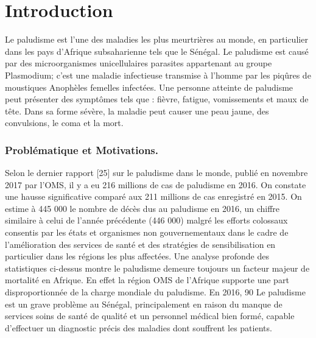
\section{Introduction}\label{Introduction}
Le paludisme est l’une des maladies les plus meurtrières au monde, en particulier dans les pays d’Afrique subsaharienne tels que le Sénégal. Le paludisme est causé par des microorganismes unicellulaires parasites appartenant au groupe Plasmodium; c'est une maladie infectieuse transmise à l'homme par les piqûres de moustiques Anophèles femelles infectées. Une personne atteinte de paludisme peut présenter des symptômes tels que : fièvre, fatigue, vomissements et maux de tête. Dans sa forme sévère, la maladie peut causer une peau jaune, des convulsions, le coma et  la mort.
\subsubsection{Problématique et Motivations.}
Selon le dernier rapport [25] sur le paludisme dans le monde, publié en novembre 2017 par l’OMS, il y a eu 216 millions de cas de paludisme en 2016. On constate une hausse significative comparé aux 211 millions de cas enregistré en 2015.
 On estime à 445 000 le nombre de décès dus au paludisme en 2016, un chiffre similaire à celui de l’année précédente (446 000) malgré les efforts colossaux  consentis par les états et organismes non gouvernementaux dans le cadre de l’amélioration des services de santé et des stratégies de sensibilisation en  particulier dans les régions les plus affectées.
Une analyse profonde des statistiques ci-dessus montre le paludisme demeure toujours un facteur majeur de mortalité en Afrique. En effet la région OMS de l'Afrique supporte une part disproportionnée de la charge mondiale du paludisme. En 2016, 90%
Le paludisme est un grave problème au Sénégal, principalement en raison du manque de services soins de santé de qualité et un personnel médical bien formé, capable d’effectuer un diagnostic précis des maladies dont souffrent les patients. 
